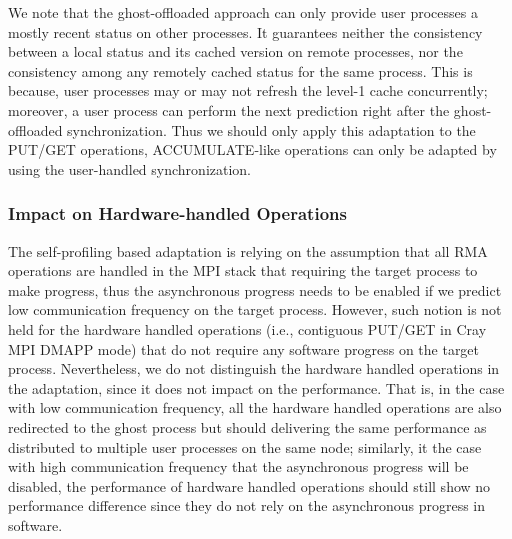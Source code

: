We note that the ghost-offloaded approach can only provide user processes
a mostly recent status on other processes. It guarantees neither the
consistency between a local status and its cached version on remote
processes, nor the consistency among any remotely cached status for the
same process. This is because, user processes may or may not refresh
the level-1 cache concurrently; moreover, a user process can perform
the next prediction right after the ghost-offloaded synchronization.
Thus we should only apply this adaptation to the PUT/GET operations,
ACCUMULATE-like operations can only be adapted by using the user-handled
synchronization.


\subsubsection{Impact on Hardware-handled Operations}

The self-profiling based adaptation is relying on the assumption that
all RMA operations are handled in the MPI stack that requiring the
target process to make progress, thus the asynchronous progress needs
to be enabled if we predict low communication frequency on the target
process. However, such notion is not held for the hardware handled
operations (i.e., contiguous PUT/GET in Cray MPI DMAPP mode) that do not
require any software progress on the target process.
Nevertheless, we do not distinguish the hardware handled operations in
the adaptation, since it does not impact on the performance. That is,
in the case with low communication frequency, all the hardware handled
operations are also redirected to the ghost process but should delivering
the same performance as distributed to multiple user processes on the
same node; similarly, it the case with high communication frequency that
the asynchronous progress will be disabled, the performance of hardware
handled operations should still show no performance difference since
they do not rely on the asynchronous progress in software.
